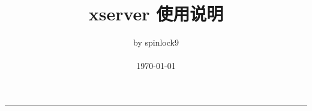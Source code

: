 \documentclass[a4paper,cs4size,oneside,cap]{ctexrep}
\title{\fontsize{50}{50}\selectfont%
    \vspace*{2cm}%
    \hfil xserver 使用说明%
    \vspace*{2cm}%
}
\author{
    \hfill by spinlock9 \\
    \hfill \\
    \hfill \today \\
}
\makeatletter
\def\printtitle{%
    {\centering\@title}}
\def\printauthor{%
    {\centering\large\@author}}
\newcommand{\newchap}[1]{ \clearpage}
\makeatother
\begin{document}
\setlength{\parindent}{2em}
\setlength{\baselineskip}{1.4em}
\setlength{\parskip}{1ex}

\thispagestyle{empty}

\begin{center}
    \colorbox{Grey} {
        \parbox[t]{\textwidth}{
            \printtitle
        }
    }
\end{center}

\vspace*{0.4\textheight}
\printauthor
\hfill\rule{0.24\linewidth}{0.6pt}
\clearpage

\tableofcontents
\clearpage

\setcounter{page}{1}

\newchap{chap1}
\newchap{chap2}
\newchap{chap3}

\makeatletter
\listoftables
\listoffigures
\makeatother
\end{document}
